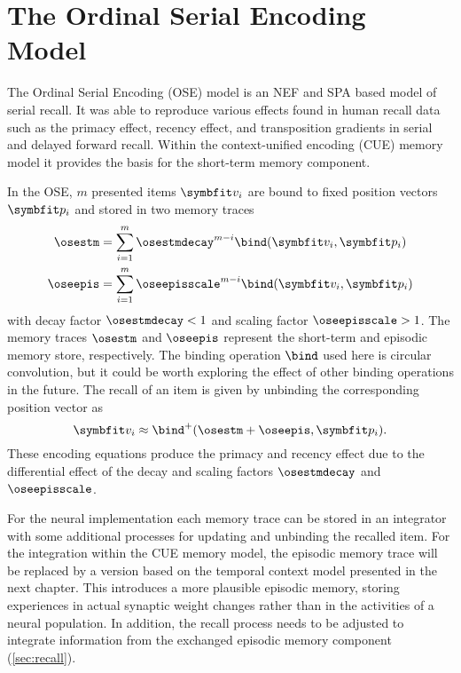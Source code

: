 \chapter{The Ordinal Serial Encoding Model}
The Ordinal Serial Encoding (OSE) model \parencite{Choo2010} is an NEF and SPA based model of serial recall.
It was able to reproduce various effects found in human recall data such as the primacy effect, recency effect, and transposition gradients in serial and delayed forward recall.
Within the context-unified encoding (CUE) memory model it provides the basis for the short-term memory component.

In the OSE, $m$ presented items $\vc v_i$ are bound to fixed position vectors $\vc p_i$ and stored in two memory traces
\begin{align}
    \osestm &= \sum_{i=1}^m \osestmdecay^{m - i} \bind(\vc v_i, \vc p_i) \\
    \oseepis &= \sum_{i=1}^m \oseepisscale^{m - i} \bind(\vc v_i, \vc p_i)
\end{align}
with decay factor $\osestmdecay < 1$ and scaling factor $\oseepisscale > 1$.
The memory traces $\osestm$ and $\oseepis$ represent the short-term and episodic memory store, respectively.
The binding operation $\bind$ used here is circular convolution, but it could be worth exploring the effect of other binding operations in the future.
The recall of an item is given by unbinding the corresponding position vector as
\begin{equation}
    \vc v_i \approx \bind^+(\osestm + \oseepis, \vc p_i) \text{.}
\end{equation}
These encoding equations produce the primacy and recency effect due to the differential effect of the decay and scaling factors $\osestmdecay$ and $\oseepisscale$.

For the neural implementation each memory trace can be stored in an integrator with some additional processes for updating and unbinding the recalled item.
For the integration within the CUE memory model, the episodic memory trace will be replaced by a version based on the temporal context model presented in the next chapter.
This introduces a more plausible episodic memory, storing experiences in actual synaptic weight changes rather than in the activities of a neural population.
In addition, the recall process needs to be adjusted to integrate information from the exchanged episodic memory component (\cref{sec:recall}).


